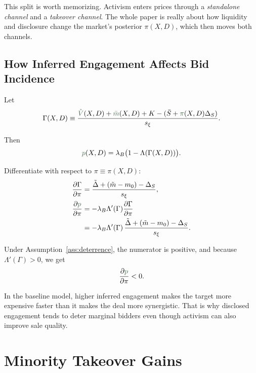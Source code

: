 \documentclass[11pt,a4paper]{article}
\theoremstyle{definition}
\theoremstyle{plain}
\theoremstyle{remark}
\newcommand{\1}{\mathbf{1}}
\newcommand{\outcome}[1]{{\color{ForestGreen!50!black}#1}}
\begin{document}
\begin{econbox}
This split is worth memorizing. Activism enters prices through a \emph{standalone channel} and a \emph{takeover channel}. The whole paper is really about how liquidity and disclosure change the market's posterior $\pi(X,D)$, which then moves both channels.
\end{econbox}

\subsection{How Inferred Engagement Affects Bid Incidence}

Let
\begin{equation}
\Gamma(X,D)
\equiv
\frac{\outcome{\hat V}(X,D)+\outcome{\bar m}(X,D)+K-(\bar S+\outcome{\pi}(X,D)\Delta_S)}{s_\xi}.
\label{eq:Gamma}
\end{equation}

Then
\begin{equation}
\outcome{p}(X,D)=\lambda_B\big(1-\Lambda(\Gamma(X,D))\big).
\label{eq:p-gamma}
\end{equation}

Differentiate with respect to $\pi \equiv \pi(X,D)$:
\begin{align}
\frac{\partial \Gamma}{\partial \pi}
&=
\frac{\tilde{\Delta} + (\tilde m-m_0) - \Delta_S}{s_\xi},
\label{eq:dGamma-dpi}
\\
\frac{\partial \outcome{p}}{\partial \pi}
&=
-\lambda_B \Lambda'(\Gamma)\frac{\partial \Gamma}{\partial \pi}
\nonumber\\
&=
-\lambda_B \Lambda'(\Gamma)\,
\frac{\tilde{\Delta} + (\tilde m-m_0) - \Delta_S}{s_\xi}.
\label{eq:dp-dpi}
\end{align}

Under Assumption~\ref{ass:deterrence}, the numerator is positive, and because $\Lambda'(\Gamma)>0$, we get
\begin{equation}
\frac{\partial \outcome{p}}{\partial \pi} < 0.
\label{eq:dp-dpi-negative}
\end{equation}

\begin{intuitionbox}
In the baseline model, higher inferred engagement makes the target more expensive faster than it makes the deal more synergistic. That is why disclosed engagement tends to deter marginal bidders even though activism can also improve sale quality.
\end{intuitionbox}

\section{Minority Takeover Gains}
\end{document}
